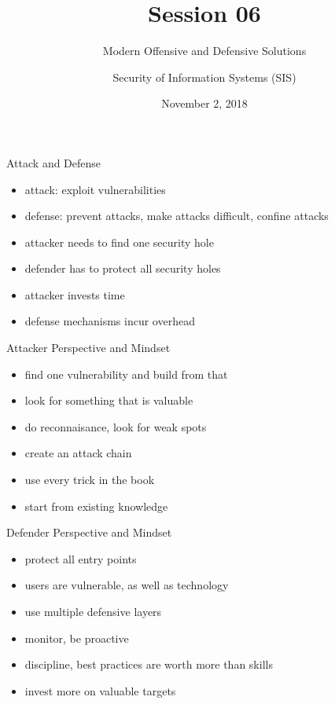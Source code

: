 \documentclass{curs}
\title[Session 06]{Session 06}
\subtitle{Modern Offensive and Defensive Solutions}
\author{Security of Information Systems (SIS)}
\date{November 2, 2018}
\begin{document}
\frame{\titlepage}

\begin{frame}{Attack and Defense}
  \begin{itemize}
    \pause \item attack: exploit vulnerabilities
    \pause \item defense: prevent attacks, make attacks difficult, confine attacks
    \pause \item attacker needs to find one security hole
    \pause \item defender has to protect all security holes
    \pause \item attacker invests time
    \pause \item defense mechanisms incur overhead
  \end{itemize}
\end{frame}

\begin{frame}{Attacker Perspective and Mindset}
  \begin{itemize}
    \pause \item find one vulnerability and build from that
    \pause \item look for something that is valuable
    \pause \item do reconnaisance, look for weak spots
    \pause \item create an attack chain
    \pause \item use every trick in the book
    \pause \item start from existing knowledge
  \end{itemize}
\end{frame}

\begin{frame}{Defender Perspective and Mindset}
  \begin{itemize}
    \pause \item protect all entry points
    \pause \item users are vulnerable, as well as technology
    \pause \item use multiple defensive layers
    \pause \item monitor, be proactive
    \pause \item discipline, best practices are worth more than skills
    \pause \item invest more on valuable targets
  \end{itemize}
\end{frame}
\end{document}
